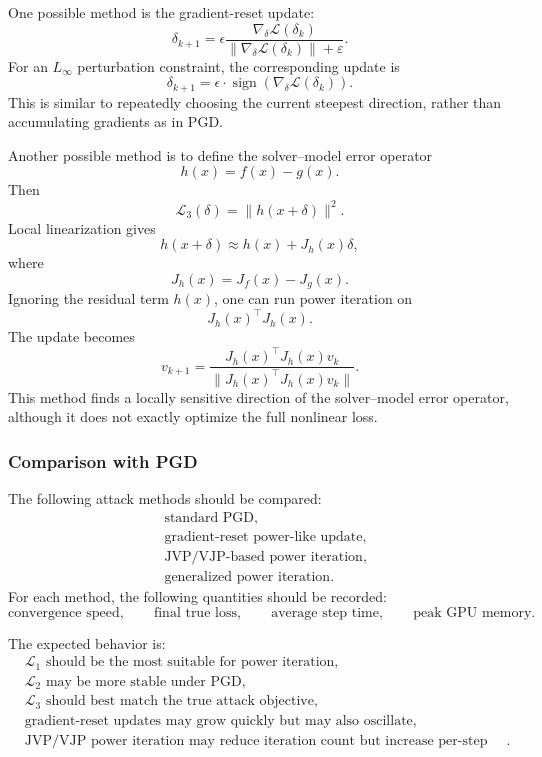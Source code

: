 \documentclass{article}
\begin{document}
One possible method is the gradient-reset update:
\[
\delta_{k+1}
=
\epsilon
\frac{
\nabla_\delta \mathcal{L}(\delta_k)
}{
\|\nabla_\delta \mathcal{L}(\delta_k)\|+\varepsilon
}.
\]
For an \(L_\infty\) perturbation constraint, the corresponding update is
\[
\delta_{k+1}
=
\epsilon
\cdot
\operatorname{sign}
\left(
\nabla_\delta \mathcal{L}(\delta_k)
\right).
\]
This is similar to repeatedly choosing the current steepest direction, rather than accumulating gradients as in PGD.

Another possible method is to define the solver--model error operator
\[
h(x) = f(x)-g(x).
\]
Then
\[
\mathcal{L}_3(\delta)
=
\|h(x+\delta)\|^2.
\]
Local linearization gives
\[
h(x+\delta)
\approx
h(x)+J_h(x)\delta,
\]
where
\[
J_h(x)=J_f(x)-J_g(x).
\]
Ignoring the residual term \(h(x)\), one can run power iteration on
\[
J_h(x)^\top J_h(x).
\]
The update becomes
\[
v_{k+1}
=
\frac{
J_h(x)^\top J_h(x)v_k
}{
\|J_h(x)^\top J_h(x)v_k\|
}.
\]
This method finds a locally sensitive direction of the solver--model error operator, although it does not exactly optimize the full nonlinear loss.

\subsubsection{Comparison with PGD}

The following attack methods should be compared:
\[
\begin{aligned}
&\text{standard PGD},\\
&\text{gradient-reset power-like update},\\
&\text{JVP/VJP-based power iteration},\\
&\text{generalized power iteration}.
\end{aligned}
\]
For each method, the following quantities should be recorded:
\[
\text{convergence speed},
\qquad
\text{final true loss},
\qquad
\text{average step time},
\qquad
\text{peak GPU memory}.
\]

The expected behavior is:
\[
\begin{aligned}
&\mathcal{L}_1 \text{ should be the most suitable for power iteration},\\
&\mathcal{L}_2 \text{ may be more stable under PGD},\\
&\mathcal{L}_3 \text{ should best match the true attack objective},\\
&\text{gradient-reset updates may grow quickly but may also oscillate},\\
&\text{JVP/VJP power iteration may reduce iteration count but increase per-step cost}.
\end{aligned}
\]
\end{document}
